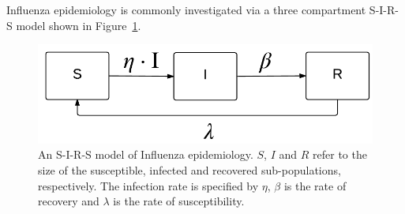 

Influenza epidemiology is commonly investigated via a three compartment S-I-R-S model shown in Figure~\ref{fig:sirs_spec}.
\begin{figure}[h!]
    \centering
    \includegraphics[width=0.5\linewidth, height=0.16\linewidth]{images/sirs}
    \caption{An S-I-R-S model of Influenza epidemiology.  {\footnotesize $ S $}, {\footnotesize $ I $} and {\footnotesize $ R $} refer to the size of the susceptible, infected and recovered sub-populations, respectively. The infection rate is specified by {\footnotesize $ \eta$}, {\footnotesize $\beta$} is the rate of recovery and {\footnotesize $\lambda$} is the rate of susceptibility.}
    \label{fig:sirs_spec}            
\end{figure}

